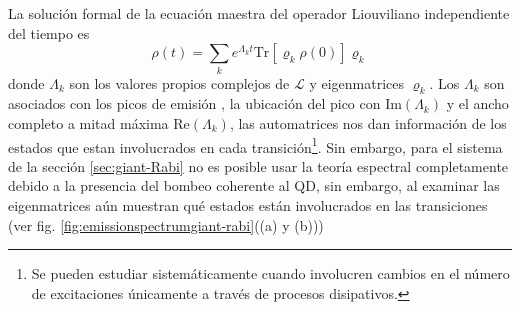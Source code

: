 \documentclass[main.tex]{subfiles}
\begin{document}
La solución formal de la ecuación maestra del operador Liouviliano independiente del tiempo es
\begin{equation}
	\rho(t) = \sum_k e^{\Lambda_k t} \text{Tr}[\varrho_k \rho(0)] \varrho_k
\end{equation}
donde $\Lambda_k$  son los valores propios complejos de $\mathcal{L}$ y eigenmatrices $\varrho_k$. Los $\Lambda_k$ son asociados con los picos de emisión \parencite{Vargas2018}, la ubicación del pico con $\text{Im}{(\Lambda_k)}$ y el ancho completo a mitad máxima $\text{Re}(\Lambda_k)$, las automatrices nos dan información de los estados que estan involucrados en cada transición\footnote{Se pueden estudiar sistemáticamente cuando involucren cambios en el número de excitaciones únicamente a través de procesos disipativos.}. Sin embargo, para el sistema de la sección \ref{sec:giant-Rabi} no es posible usar la teoría espectral completamente debido a la presencia del bombeo coherente al QD, sin embargo, al examinar las eigenmatrices aún muestran qué estados están involucrados en las transiciones (ver fig. \ref{fig:emissionspectrumgiant-rabi}((a) y (b)))
%
\end{document}
